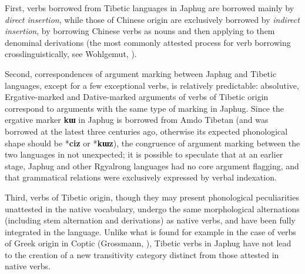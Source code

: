 \documentclass[oneside,a4paper,11pt]{article}
\newcommand{\ipa}[1]{{\phon\textbf{\mbox{#1}}}} %
\begin{document}
First, verbs borrowed from Tibetic languages in Japhug are borrowed mainly by \textit{direct insertion}, while those of Chinese origin are exclusively borrowed by \textit{indirect insertion}, by borrowing Chinese verbs as nouns and then applying to them denominal derivations (the most commonly attested process for verb borrowing crosslinguistically, see Wohlgemut, \citeyear{wohlgemuth09verbal}). 

Second, correspondences of argument marking between Japhug and Tibetic languages, except for a few exceptional verbs, is relatively predictable: absolutive, Ergative-marked and Dative-marked arguments of verbs of Tibetic origin correspond to arguments with the same type of marking in Japhug. Since the ergative marker \ipa{kɯ} in Japhug is borrowed from Amdo Tibetan (and was borrowed at the latest three centuries ago, otherwise its expected phonological shape should be *\ipa{ciz} or *\ipa{kɯz}), the congruence of argument marking between the two languages in not unexpected; it is possible to speculate that at an earlier stage, Japhug and other Rgyalrong languages  had no core argument flagging, and that grammatical relations were exclusively expressed by verbal indexation.

Third, verbs of Tibetic origin, though they may present phonological peculiarities unattested in the native vocabulary, undergo the same morphological alternations (including stem alternation and derivations) as native verbs, and have been fully integrated in the language. Unlike what is found for example in the case of verbs of Greek origin in Coptic (Grossmann, \citeyear{grossmann16contact}), Tibetic verbs in Japhug have not lead to the creation of a new transitivity category distinct from those attested in native verbs. 




\end{document}
